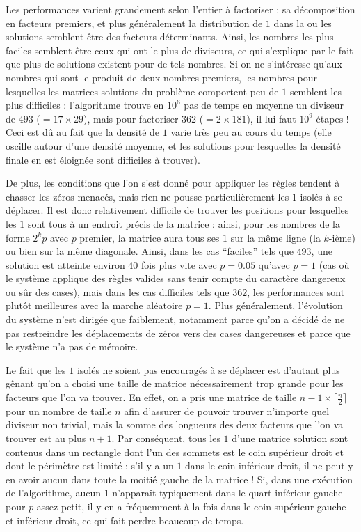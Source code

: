 \documentclass[11pt, openany]{article}
\begin{document}
Les performances varient grandement selon l'entier à factoriser : sa dé\-composition en facteurs premiers, et plus généralement la distribution de $1$ dans la ou les solutions semblent être des facteurs déterminants. Ainsi, les nombres les plus faciles semblent être ceux qui ont le plus de diviseurs, ce qui s'explique par le fait que plus de solutions existent pour de tels nombres. Si on ne s'intéresse qu'aux nombres qui sont le produit de deux nombres premiers, les nombres pour lesquelles les matrices solutions du problème comportent peu de $1$ semblent les plus difficiles : l'algorithme trouve en $10^6$ pas de temps en moyenne un diviseur de $493$ ($ = 17\times 29$), mais pour factoriser $362$ ($ = 2\times 181$), il lui faut $10^9$ étapes ! Ceci est dû au fait que la densité de $1$ varie très peu au cours du temps (elle oscille autour d'une densité moyenne, et les solutions pour lesquelles la densité finale en est éloignée sont difficiles à trouver). 

\medskip

De plus, les conditions que l'on s'est donné pour appliquer les règles tendent à chasser les zéros menacés, mais rien ne pousse particulièrement les $1$ isolés à se déplacer. Il est donc relativement difficile de trouver les positions pour lesquelles les $1$ sont tous à un endroit précis de la matrice : ainsi, pour les nombres de la forme $2^kp$ avec $p$ premier, la matrice aura tous ses $1$ sur la même ligne (la $k$-ième) ou bien sur la même diagonale. Ainsi, dans les cas ``faciles'' tels que $493$, une solution est atteinte environ $40$ fois plus vite avec $p=0.05$ qu'avec $p=1$ (cas où le système applique des règles valides sans tenir compte du caractère dangereux ou sûr des cases), mais dans les cas difficiles tels que $362$, les performances sont plutôt meilleures avec la marche aléatoire $p=1$. Plus généralement, l'évolution du système n'est dirigée que faiblement, notamment parce qu'on a décidé de ne pas restreindre les déplacements de zéros vers des cases dangereuses et parce que le système n'a pas de mémoire.

\medskip
 
Le fait que les $1$ isolés ne soient pas encouragés à se déplacer est d'autant plus gênant qu'on a choisi une taille de matrice nécessairement trop grande pour les facteurs que l'on va trouver. En effet, on a pris une matrice de taille $n-1 \times \lceil \frac{n}{2} \rceil$ pour un nombre de taille $n$ afin d'assurer de pouvoir trouver n'importe quel diviseur non trivial, mais la somme des longueurs des deux facteurs que l'on va trouver est au plus $n+1$. Par conséquent, tous les $1$ d'une matrice solution sont contenus dans un rectangle dont l'un des sommets est le coin supérieur droit et dont le périmètre est limité : s'il y a un $1$ dans le coin inférieur droit, il ne peut y en avoir aucun dans toute la moitié gauche de la matrice ! Si, dans une exécution de l'algorithme, aucun $1$ n'apparaît typiquement dans le quart inférieur gauche pour $p$ assez petit, il y en a fréquemment à la fois dans le coin supérieur gauche et inférieur droit, ce qui fait perdre beaucoup de temps. 
\end{document}
